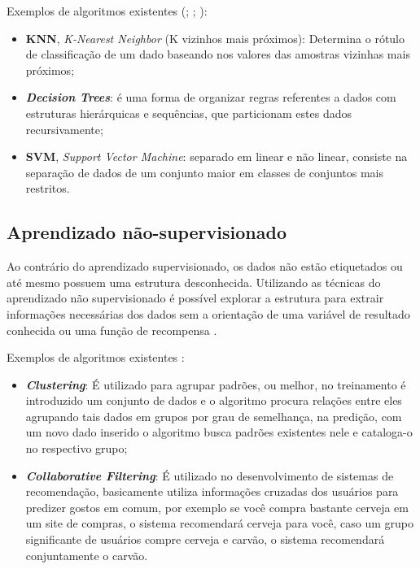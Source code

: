 Exemplos de algoritmos existentes (\cite{lorena2007introduccao}; \cite{kirk2014thoughtful}; \cite{murthy1998automatic}):

\begin{itemize}
    \item \textbf{KNN},\textit{ K-Nearest Neighbor} (K vizinhos mais próximos): Determina o rótulo de classificação de um dado baseando nos valores das amostras vizinhas mais próximos;
    \item \textit{\textbf{Decision Trees}}: é uma forma de organizar regras referentes a dados com estruturas hierárquicas e sequências, que particionam estes dados recursivamente;
    \item \textbf{SVM},\textit{ Support Vector Machine}: separado em linear e não linear, consiste na separação de dados de um conjunto maior em classes de conjuntos mais restritos.
\end{itemize}

\subsection{Aprendizado não-supervisionado}
Ao contrário do aprendizado supervisionado, os dados não estão etiquetados ou até mesmo possuem uma estrutura desconhecida. Utilizando as técnicas do aprendizado não supervisionado é possível explorar a estrutura para extrair informações necessárias dos dados sem a orientação de uma variável de resultado conhecida ou uma função de recompensa \cite{geron2017hands}.

Exemplos de algoritmos existentes \cite{kirk2014thoughtful}:
\begin{itemize}
    \item  \textbf{\textit{Clustering}}: É utilizado para agrupar padrões, ou melhor, no treinamento é introduzido um conjunto de dados e o algoritmo procura relações entre eles agrupando tais dados em grupos por grau de semelhança, na predição, com um novo dado inserido o algoritmo busca padrões existentes nele e cataloga-o no respectivo grupo;   
    \item  \textbf{\textit{Collaborative Filtering}}: É utilizado no desenvolvimento de sistemas de recomendação, basicamente utiliza informações cruzadas dos usuários para predizer gostos em comum, por exemplo se você compra bastante cerveja em um site de compras, o sistema recomendará cerveja para você, caso um grupo significante de usuários compre cerveja e carvão, o sistema recomendará conjuntamente o carvão.
\end{itemize}

